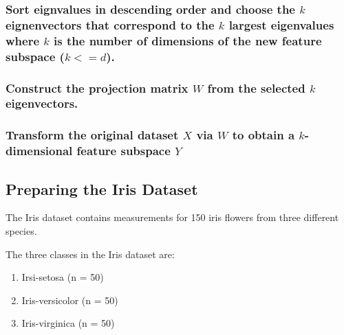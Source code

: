 \documentclass[11pt]{article}
\providecommand{\tightlist}{%
      \setlength{\itemsep}{0pt}\setlength{\parskip}{0pt}}
\begin{document}
\subsubsection{\texorpdfstring{Sort eignvalues in descending order and
choose the \(k\) eignenvectors that correspond to the \(k\) largest
eigenvalues where \(k\) is the number of dimensions of the new feature
subspace
(\(k <= d\)).}{Sort eignvalues in descending order and choose the k eignenvectors that correspond to the k largest eigenvalues where k is the number of dimensions of the new feature subspace (k \textless{}= d).}}\label{sort-eignvalues-in-descending-order-and-choose-the-k-eignenvectors-that-correspond-to-the-k-largest-eigenvalues-where-k-is-the-number-of-dimensions-of-the-new-feature-subspace-k-d.}

\subsubsection{\texorpdfstring{Construct the projection matrix \(W\)
from the selected \(k\)
eigenvectors.}{Construct the projection matrix W from the selected k eigenvectors.}}\label{construct-the-projection-matrix-w-from-the-selected-k-eigenvectors.}

\subsubsection{\texorpdfstring{Transform the original dataset \(X\) via
\(W\) to obtain a \(k\)-dimensional feature subspace
\(Y\)}{Transform the original dataset X via W to obtain a k-dimensional feature subspace Y}}\label{transform-the-original-dataset-x-via-w-to-obtain-a-k-dimensional-feature-subspace-y}

\subsection{Preparing the Iris
Dataset}\label{preparing-the-iris-dataset}

The Iris dataset contains measurements for 150 iris flowers from three
different species.

The three classes in the Iris dataset are:

\begin{enumerate}
\def\labelenumi{\arabic{enumi}.}
\tightlist
\item
  Irsi-setosa (n = 50)
\item
  Iris-versicolor (n = 50)
\item
  Iris-virginica (n = 50)
\end{enumerate}
\end{document}
